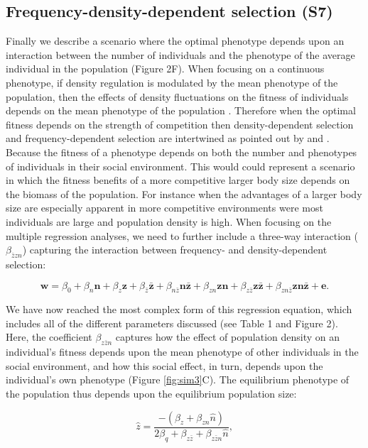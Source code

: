 \documentclass{article}
\begin{document}
\subsection{Frequency-density-dependent selection (S7)}
Finally we describe a scenario where the optimal phenotype depends upon an interaction between the number of individuals and the phenotype of the average individual in the population (Figure 2F). When focusing on a continuous phenotype, if density regulation is modulated by the mean phenotype of the population, then the effects of density fluctuations on the fitness of individuals depends on the mean phenotype of the population \citep{Engen2020}. Therefore when the optimal fitness depends on the strength of competition then density-dependent selection and frequency-dependent selection are intertwined as pointed out by \cite{Smouse1976} and \citep{Heino1998}. Because the fitness of a phenotype depends on both the number and phenotypes of individuals in their social environment. This would could represent a scenario in which the fitness benefits of a more competitive larger body size depends on the biomass of the population. For instance when the advantages of a larger body size are especially apparent in more competitive environments were most individuals are large and population density is high. When focusing on the multiple regression analyses, we need to further include a three-way interaction ($\beta_{\bar{z}zn}$) capturing the interaction between frequency- and density-dependent selection:

\begin{equation} \label{eq: fullw}
\bm{w}=\beta_{0} +\beta_{n} \bm{n} + \beta_{z} \bm{z}+ \beta_{\bar{z}} \bm{\bar{z}}  +   \beta_{n\bar{z}} \bm{n\bar{z}} +   \beta_{zn} \bm{zn} + \beta_{z\bar{z}} \bm{z\bar{z}}   +   \beta_{zn\bar{z}} \bm{zn\bar{z}} + \bm{e}.
\end{equation}

\noindent We have now reached the most complex form of this regression equation, which includes all of the different parameters discussed (see Table 1 and Figure 2). Here, the coefficient $\beta_{z\bar{z}n}$ captures how the effect of population density on an individual's fitness depends upon the mean phenotype of other individuals in the social environment, and how this social effect, in turn, depends upon the individual's own phenotype (Figure \ref{fig:sim3}C). The equilibrium phenotype of the population thus depends upon the equilibrium population size: 

\begin{equation} 
\hat{z}=\frac{-(\beta_{z}+\beta_{zn}\hat{n})}{2\beta_{q} + \beta_{z\bar{z}} + \beta_{z\bar{z}n}\hat{n}},
\end{equation} 
\end{document}
